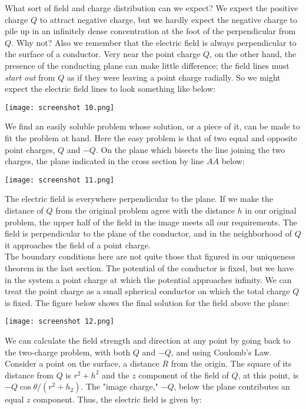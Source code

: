 \documentclass[svgnames]{article}
\begin{document}
What sort of field and charge distribution can we expect? We expect the
positive charge $Q$ to attract negative charge, but we hardly expect the
negative charge to pile up in an infinitely dense concentration at the foot of
the perpendicular from $Q$. Why not? Also we remember that the electric field
is always perpendicular to the surface of a conductor. Very near the point
charge $Q$, on the other hand, the presence of the conducting plane can make
little difference; the field lines must \textit{start out} from $Q$ as if they
were leaving a point charge radially. So we might expect the electric field
lines to look something like below: 

\begin{center}
\texttt{[image: screenshot 10.png]}
\end{center}

We find an easily soluble problem whose solution, or a piece of it, can be made
to fit the problem at hand. Here the easy problem is that of two equal and
opposite point charges, $Q$ and $-Q$. On the plane which bisects the line
joining the two charges, the plane indicated in the cross section by line $AA$
below: 

\begin{center}
\texttt{[image: screenshot 11.png]}
\end{center}

The electric field is everywhere perpendicular to the plane. If we make the
distance of $Q$ from the original problem agree with the distance $h$ in our
original problem, the upper half of the field in the image meets all our
requirements. The field is perpendicular to the plane of the conductor, and in
the neighborhood of $Q$ it approaches the field of a point charge. \\

The boundary conditions here are not quite those that figured in our uniqueness
theorem in the last section. The potential of the conductor is fixed, but we
have in the system a point charge at which the potential approaches infinity.
We can treat the point charge as a small spherical conductor on which the total
charge $Q$ is fixed. The figure below shows the final solution for the field
above the plane: 

\begin{center}
\texttt{[image: screenshot 12.png]}
\end{center}

We can calculate the field strength and direction at any point by going back to
the two-charge problem, with both $Q$ and $-Q$, and using Coulomb's Law. \\
Consider a point on the surface, a distance $R$ from the origin. The square of
its distance from $Q$ is $r^2 + h^2$ and the $z$ component of the field of $Q$,
at this point, is $-Q\cos\theta / (r^2 + h_2)$. The "image charge," $-Q$, below
the plane contributes an equal $z$ component. Thus, the electric field is given
by: 
\end{document}
